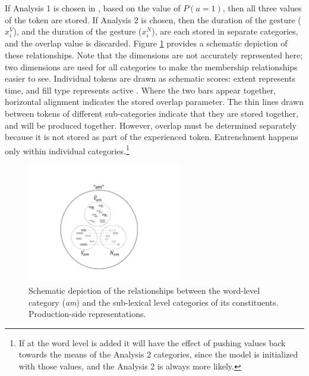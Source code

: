 If Analysis 1 is chosen in , based on the value of $P(a=1)$,
then all three values of the token are stored. If Analysis 2 is chosen,
then the duration of the  gesture ($x_{i}^{V}$), and the
duration of the  gesture ($x_{i}^{N}$), are each stored in separate
categories, and the overlap value is discarded. Figure \ref{fig:MultiParse-Reps}
provides a schematic depiction of these relationships. Note that the
dimensions are not accurately represented here; two dimensions are
used for all categories to make the membership relationships easier
to see. Individual tokens are drawn as schematic  scores:
extent represents time, and fill type represents active .
Where the two bars appear together, horizontal alignment indicates the stored  overlap parameter. The thin
lines drawn between tokens of different sub-categories indicate that
they are stored together, and will be produced together. However, overlap must
be determined separately because it is not stored as part of the experienced token. Entrenchment happens only
within individual  categories.\footnote{If  at the word level is added it will have the effect
of pushing values back towards the means of the Analysis 2 categories,
since the model is initialized with those values, and the Analysis 2
 is always more likely.}

\begin{figure}[h]
\includegraphics[width=0.6\textwidth]{figures/MultiParseModel.pdf}\caption{\label{fig:MultiParse-Reps}Schematic depiction of the relationships
between the word-level category (\textit{am}) and the sub-lexical level
categories of its constituents. Production-side representations.}
\end{figure}

